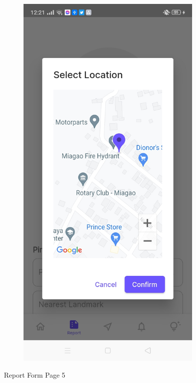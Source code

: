 \begin{figure}[!h]
\begin{subfigure}[c]{0.30\linewidth}
    \end{subfigure}
    \centering
    \begin{subfigure}[c]{0.30\linewidth}
        \centering
        \includegraphics[scale=0.15]{figures/Chapter4/Main/p5-3.jpg}
    \end{subfigure}
    \caption{Report Form Page 5}
    \label{fig:ReportPage5}
\end{figure}

